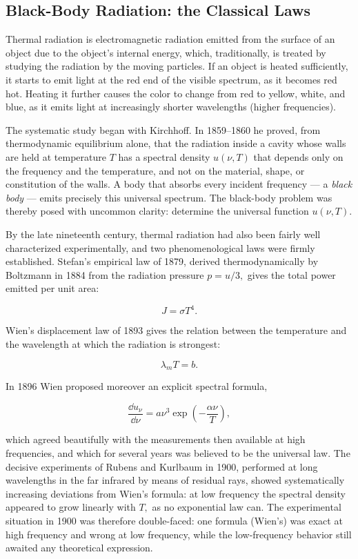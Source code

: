 \subsection{Black-Body Radiation: the Classical Laws}
Thermal radiation is electromagnetic radiation emitted from the surface of an object due to the object's internal energy, which, traditionally, is treated by studying the radiation by the moving particles. If an object is heated sufficiently, it starts to emit light at the red end of the visible spectrum, as it becomes red hot. Heating it further causes the color to change from red to yellow, white, and blue, as it emits light at increasingly shorter wavelengths (higher frequencies).

The systematic study began with Kirchhoff. In 1859--1860 he proved, from thermodynamic equilibrium alone, that the radiation inside a cavity whose walls are held at temperature $T$ has a spectral density $u(\nu,T)$ that depends only on the frequency and the temperature, and not on the material, shape, or constitution of the walls. A body that absorbs every incident frequency --- a \emph{black body} --- emits precisely this universal spectrum. The black-body problem was thereby posed with uncommon clarity: determine the universal function $u(\nu,T).$

By the late nineteenth century, thermal radiation had also been fairly well characterized experimentally, and two phenomenological laws were firmly established. Stefan's empirical law of 1879, derived thermodynamically by Boltzmann in 1884 from the radiation pressure $p=u/3,$ gives the total power emitted per unit area:
\begin{linenomath}
\begin{equation}
    J = \sigma T^4.
\end{equation}
\end{linenomath}
Wien's displacement law of 1893 gives the relation between the temperature and the wavelength at which the radiation is strongest:
\begin{linenomath}
\begin{equation}
    \lambda_m T = b.
\end{equation}
\end{linenomath}
In 1896 Wien proposed moreover an explicit spectral formula,
\begin{linenomath}
\begin{equation}
    \frac{\dd u_\nu}{\dd\nu}= a\nu^3 \exp\left(-\frac{\alpha\nu}{T}\right),
\end{equation}
\end{linenomath}
which agreed beautifully with the measurements then available at high frequencies, and which for several years was believed to be the universal law. The decisive experiments of Rubens and Kurlbaum in 1900, performed at long wavelengths in the far infrared by means of residual rays, showed systematically increasing deviations from Wien's formula: at low frequency the spectral density appeared to grow linearly with $T,$ as no exponential law can. The experimental situation in 1900 was therefore double-faced: one formula (Wien's) was exact at high frequency and wrong at low frequency, while the low-frequency behavior still awaited any theoretical expression.

